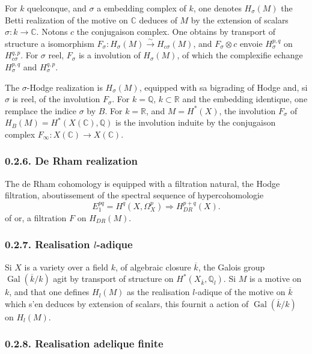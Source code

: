 \documentclass[12pt,a4paper]{article}
\theoremstyle{plain}
\theoremstyle{definition}
\theoremstyle{remark}
\DeclareMathOperator{\Gal}{Gal}
\newcommand{\Q}{\mathbb{Q}}
\newcommand{\R}{\mathbb{R}}
\newcommand{\C}{\mathbb{C}}
\begin{document}
For $k$ quelconque, and $\sigma$ a embedding complex of $k$, one denotes $H_\sigma(M)$ the
Betti realization of the motive on $\C$ deduces of $M$ by the extension of scalars
$\sigma: k \to \C$. Notons $c$ the conjugaison complex. One obtains by transport of structure
a isomorphism $F_\sigma: H_\sigma(M) \xrightarrow{\sim} H_{c\sigma}(M)$, and $F_\sigma \otimes c$ envoie
$H_\sigma^{p,q}$ on $H_{c\sigma}^{q,p}$. For $\sigma$ reel, $F_\sigma$ is a involution of $H_\sigma(M)$, of which the
complexifie echange $H_\sigma^{p,q}$ and $H_\sigma^{q,p}$.

The $\sigma$-Hodge realization is $H_\sigma(M)$, equipped with sa bigrading of Hodge and,
si $\sigma$ is reel, of the involution $F_\sigma$. For $k = \Q$, $k \subset \R$ and the embedding
identique, one remplace the indice $\sigma$ by $B$. For $k = \R$, and $M = H^*(X)$, the involution
$F_\sigma$ of $H_B(M) = H^*(X(\C), \Q)$ is the involution induite by the conjugaison complex
$F_\infty: X(\C) \to X(\C)$.

\subsubsection*{0.2.6. De Rham realization}

The de Rham cohomology is equipped with a filtration natural, the Hodge filtration,
aboutissement of the spectral sequence of hypercohomologie
\[
E_1^{pq} = H^q(X, \Omega_X^p) \Rightarrow H_{DR}^{p+q}(X).
\]
of or, a filtration $F$ on $H_{DR}(M)$.

\subsubsection*{0.2.7. Realisation $l$-adique}

Si $X$ is a variety over a field $k$, of algebraic closure $\overline{k}$, the Galois group
$\Gal(\overline{k}/k)$ agit by transport of structure on $H^*(X_{\overline{k}}, \Q_l)$. Si $M$ is a motive
on $k$, and that one defines $H_l(M)$ as the realisation $l$-adique of the motive on $\overline{k}$ which
s'en deduces by extension of scalars, this fournit a action of $\Gal(\overline{k}/k)$ on $H_l(M)$.

\subsubsection*{0.2.8. Realisation adelique finite}
\end{document}
